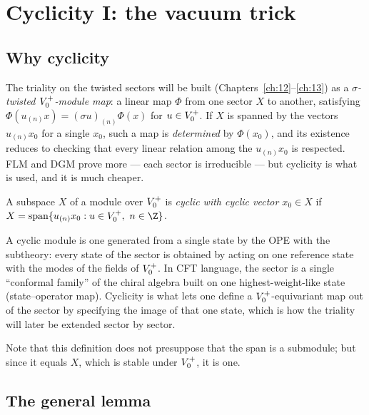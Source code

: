 \section{Cyclicity I: the vacuum trick}\label{ch11:sec:vacuumtrick}

\subsection{Why cyclicity}

The triality on the twisted sectors will be built (Chapters~\ref{ch:12}--\ref{ch:13}) as a
\emph{$\sigma$-twisted $V_0^{+}$-module map}: a linear map $\Phi$ from one sector $X$ to another,
satisfying $\Phi(u_{(n)}x)=(\sigma u)_{(n)}\Phi(x)$ for $u\in V_0^{+}$.  If $X$ is spanned by the
vectors $u_{(n)}x_0$ for a single $x_0$, such a map is \emph{determined} by $\Phi(x_0)$, and its
existence reduces to checking that every linear relation among the $u_{(n)}x_0$ is respected.
FLM and DGM prove more --- each sector is irreducible --- but cyclicity is what is used, and it is
much cheaper.

\begin{definition}\label{ch11:def:cyclic}
A subspace $X$ of a module over $V_0^{+}$ is \emph{cyclic with cyclic vector $x_0\in X$} if
$X=\operatorname{span}\{u_{(n)}x_0 : u\in\chelVz,\ n\in\Z\}$.
\end{definition}

\begin{physics}
A cyclic module is one generated from a single state by the OPE with the subtheory: every state of the sector is obtained by acting on one reference state with the modes of the fields of $V_0^{+}$. In CFT language, the sector is a single ``conformal family'' of the chiral algebra built on one highest-weight-like state (state--operator map). Cyclicity is what lets one define a $V_0^{+}$-equivariant map out of the sector by specifying the image of that one state, which is how the triality will later be extended sector by sector.
\end{physics}

Note that this definition does not presuppose that the span is a submodule; but since it equals
$X$, which is stable under $V_0^{+}$, it is one.

\subsection{The general lemma}

